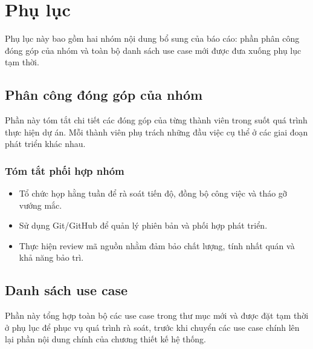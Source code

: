 \chapter{Phụ lục}
\renewcommand{\thefigure}{A.\arabic{figure}}
\renewcommand{\thetable}{A.\arabic{table}}

Phụ lục này bao gồm hai nhóm nội dung bổ sung của báo cáo: phần phân công đóng góp của nhóm và toàn bộ danh sách use case mới được đưa xuống phụ lục tạm thời.

\newpage
\section{Phân công đóng góp của nhóm}
Phần này tóm tắt chi tiết các đóng góp của từng thành viên trong suốt quá trình thực hiện dự án.
Mỗi thành viên phụ trách những đầu việc cụ thể ở các giai đoạn phát triển khác nhau.



\subsection{Tóm tắt phối hợp nhóm}
\begin{itemize}
    \item Tổ chức họp hằng tuần để rà soát tiến độ, đồng bộ công việc và tháo gỡ vướng mắc.
    \item Sử dụng Git/GitHub để quản lý phiên bản và phối hợp phát triển.
    \item Thực hiện review mã nguồn nhằm đảm bảo chất lượng, tính nhất quán và khả năng bảo trì.
\end{itemize}

\newpage
\section{Danh sách use case}
Phần này tổng hợp toàn bộ các use case trong thư mục mới và được đặt tạm thời ở phụ lục để phục vụ quá trình rà soát, trước khi chuyển các use case chính lên lại phần nội dung chính của chương thiết kế hệ thống.

